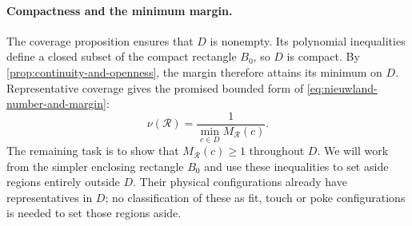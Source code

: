 \paragraph{Compactness and the minimum margin.}
The coverage proposition ensures that $D$ is nonempty. Its polynomial
inequalities define a closed subset of the compact rectangle $B_0$,
so $D$ is compact. By \cref{prop:continuity-and-openness}, the margin
therefore attains its minimum on $D$. Representative coverage gives the promised bounded
form of \cref{eq:nieuwland-number-and-margin}:
\begin{equation}\label{eq:nieuwland-number-on-reduced-domain}
  \nu(\mathcal R)=\frac{1}{\displaystyle\min_{c\in D}M_{\mathcal R}(c)}.
\end{equation}
The remaining task is to show that $M_{\mathcal R}(c)\ge1$ throughout $D$.
We will work from the simpler enclosing rectangle $B_0$ and use these
inequalities to set aside regions entirely outside $D$. Their physical
configurations already have representatives in $D$; no classification of these
as fit, touch or poke configurations is needed to set those regions aside.
